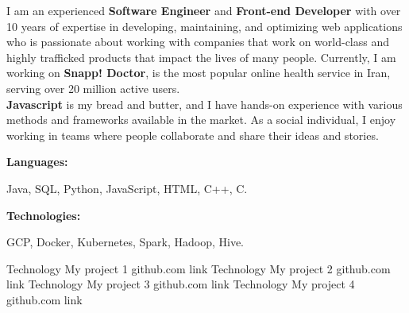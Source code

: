 \documentclass[9pt]{developercv} %
\begin{document}
    \begin{minipage}[t]{0.46\textwidth}
        \vspace{-6pt}

        I am an experienced \textbf{Software Engineer} and \textbf{Front-end Developer} with over
        10 years of expertise in developing, maintaining, and optimizing web applications who is
        passionate about working with companies that work on world-class and highly trafficked
        products that impact the lives of many people. Currently, I am working on
        \textbf{Snapp! Doctor}, is the most popular online health service in Iran, serving over 20
        million active users.\\
        \textbf{Javascript} is my bread and butter, and I have hands-on experience with various methods and
        frameworks available in the market. As a social individual, I enjoy working in teams where people collaborate and share their ideas and stories.\\

    \end{minipage}
    \hfill %
    \begin{minipage}[t]{0.465\textwidth}
        \vspace{-6pt}

        \begin{minipage}[t]{0.2\textwidth}
            \textbf{Languages:}
        \end{minipage}
        \hfill
        \begin{minipage}[t]{0.73\textwidth}
            Java, SQL, Python, JavaScript, HTML, C++, C.
        \end{minipage}
        \vspace{4mm}

        \begin{minipage}[t]{0.2\textwidth}
            \textbf{Technologies:}
        \end{minipage}
        \hfill
        \begin{minipage}[t]{0.73\textwidth}
            GCP, Docker, Kubernetes, Spark, Hadoop, Hive.
        \end{minipage}

    \end{minipage}

    \begin{entrylist}
        \entry
        {Technology}
        {My project 1}
        {github.com link}
        {%
            \lipsum[1][1-3]}
        \entry
        {Technology}
        {My project 2}
        {github.com link}
        {%
            \lipsum[1][1-3]}
        \entry
        {Technology}
        {My project 3}
        {github.com link}
        {%
            \lipsum[1][1-3]}
        \entry
        {Technology}
        {My project 4}
        {github.com link}
        {%
            \lipsum[1][1-3]}
    \end{entrylist}
\end{document}
